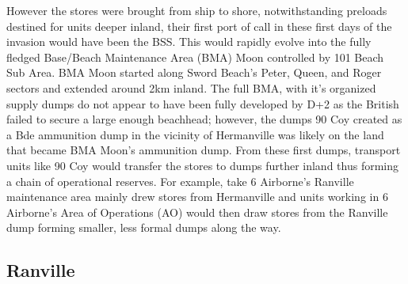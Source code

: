 \documentclass[noraggedright]{turabian-researchpaper}
\begin{document}
However the stores were brought from ship to shore, notwithstanding preloads 
destined for units deeper inland, their first port of call in these first 
days of the invasion would have been the BSS.  This would rapidly evolve into 
the fully fledged Base/Beach Maintenance Area (BMA) Moon controlled by 101 
Beach Sub Area.\autocite[See traces in Neptune No. 1 RAF Beach Squadron 
Operation Order found in Appendix C to the May records.  Traces are located 
between the Operation Order and the Signals Plan that follows the orders.  
Traces use a derivative of map sheet 7F][]%
{1raf}  BMA Moon started along Sword Beach's Peter, Queen, and Roger sectors 
and extended around 2km inland.  The full BMA, with it's organized supply 
dumps do not appear to have been fully developed by D+2 as the British failed 
to secure a large enough beachhead; however, the dumps 90 Coy created as a 
Bde ammunition dump in the vicinity of Hermanville was likely on the land 
that became BMA Moon's ammunition dump.\autocite[Trace of BMA Moon annexed to 
Neptune RAF Beach Squadron Operation Order found in] [Legend entry 67]{1raf}   
From these first dumps, transport units like 90 Coy would transfer the stores 
to dumps further inland thus forming a chain of operational reserves.  For 
example, take 6 Airborne's Ranville maintenance area mainly drew stores from 
Hermanville and units working in 6 Airborne's Area of Operations (AO) would 
then draw stores from the Ranville dump forming smaller, less formal dumps 
along the way.

\subsection{Ranville}




\end{document}
